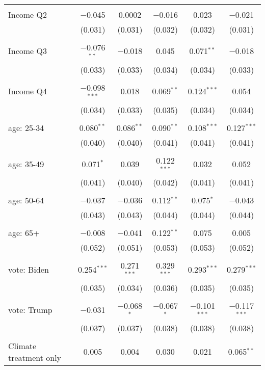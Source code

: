 \begin{tabular}{@{\extracolsep{5pt}}lccccc}
  & & & & & \\ 
 Income Q2 & $-$0.045 & 0.0002 & $-$0.016 & 0.023 & $-$0.021 \\ 
  & (0.031) & (0.031) & (0.032) & (0.032) & (0.031) \\ 
  & & & & & \\ 
 Income Q3 & $-$0.076$^{**}$ & $-$0.018 & 0.045 & 0.071$^{**}$ & $-$0.018 \\ 
  & (0.033) & (0.033) & (0.034) & (0.034) & (0.033) \\ 
  & & & & & \\ 
 Income Q4 & $-$0.098$^{***}$ & 0.018 & 0.069$^{**}$ & 0.124$^{***}$ & 0.054 \\ 
  & (0.034) & (0.033) & (0.035) & (0.034) & (0.034) \\ 
  & & & & & \\ 
 age: 25-34 & 0.080$^{**}$ & 0.086$^{**}$ & 0.090$^{**}$ & 0.108$^{***}$ & 0.127$^{***}$ \\ 
  & (0.040) & (0.040) & (0.041) & (0.041) & (0.041) \\ 
  & & & & & \\ 
 age: 35-49 & 0.071$^{*}$ & 0.039 & 0.122$^{***}$ & 0.032 & 0.052 \\ 
  & (0.041) & (0.040) & (0.042) & (0.041) & (0.041) \\ 
  & & & & & \\ 
 age: 50-64 & $-$0.037 & $-$0.036 & 0.112$^{**}$ & 0.075$^{*}$ & $-$0.043 \\ 
  & (0.043) & (0.043) & (0.044) & (0.044) & (0.044) \\ 
  & & & & & \\ 
 age: 65+ & $-$0.008 & $-$0.041 & 0.122$^{**}$ & 0.075 & 0.005 \\ 
  & (0.052) & (0.051) & (0.053) & (0.053) & (0.052) \\ 
  & & & & & \\ 
 vote: Biden & 0.254$^{***}$ & 0.271$^{***}$ & 0.329$^{***}$ & 0.293$^{***}$ & 0.279$^{***}$ \\ 
  & (0.035) & (0.034) & (0.036) & (0.035) & (0.035) \\ 
  & & & & & \\ 
 vote: Trump & $-$0.031 & $-$0.068$^{*}$ & $-$0.067$^{*}$ & $-$0.101$^{***}$ & $-$0.117$^{***}$ \\ 
  & (0.037) & (0.037) & (0.038) & (0.038) & (0.038) \\ 
  & & & & & \\ 
 Climate treatment only & 0.005 & 0.004 & 0.030 & 0.021 & 0.065$^{**}$ \\ 

\end{tabular}
